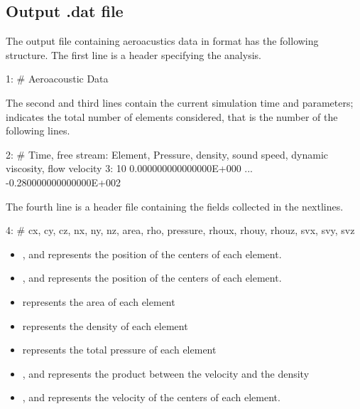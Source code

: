 \subsection{Output .dat file}
The output file containing aeroacustics data in  format has 
the following structure. The first line is a header specifying the 
analysis.
\begin{inputfile}[frame=single]
  1: # Aeroacoustic Data
\end{inputfile}
The second and third lines contain the current simulation time and parameters; 
 indicates the total number of elements considered, that is the number of the following lines. 
\begin{inputfile}[frame=single]
  2: # Time, free stream: Element, Pressure, density, sound speed, 
        dynamic viscosity, flow velocity 
  3: 10  0.000000000000000E+000   ... -0.280000000000000E+002
\end{inputfile}
The fourth line is a header file containing the fields collected in the nextlines.
\begin{inputfile}[frame=single]
  4: # cx, cy, cz, nx, ny, nz, area, rho, pressure, rhoux, rhouy, rhouz, svx, svy, svz
\end{inputfile}
\begin{itemize} 
  \item {},  and  represents the position of the centers of each element.
  \item {},  and  represents the position of the centers of each element.
  \item {} represents the area of each element
  \item {} represents the density of each element
  \item {} represents the total pressure of each element
  \item {},  and  represents the product between the velocity and the density 
  \item {},  and  represents the velocity of the centers of each element.
\end{itemize}
